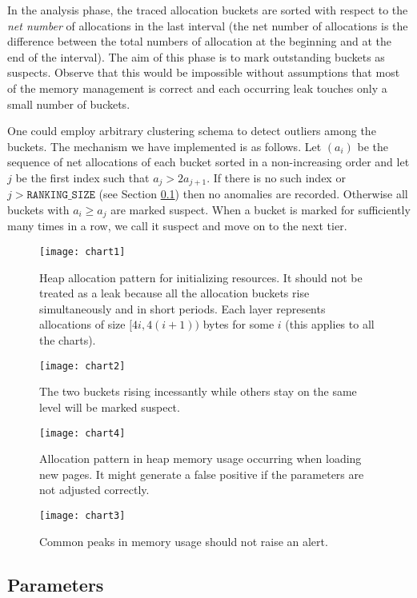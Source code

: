 \documentclass[preprint, numbers]{sigplanconf}
\begin{document}
In the analysis phase, the traced allocation buckets are sorted with respect to the \textit{net number} of allocations
in the last interval
(the net number of allocations is the difference between the total numbers of allocation at
the beginning and at the end of the interval).
The aim of this phase is to mark outstanding buckets as suspects.
Observe that this would be impossible without assumptions that
most of the memory management is correct and each occurring leak
touches only a small number of buckets.

One could employ arbitrary clustering schema to detect outliers among the buckets.
The mechanism we have implemented is as follows.
Let $(a_i)$ be the sequence of net allocations of each bucket sorted in a non-increasing order
and let $j$ be the first index such that $a_j > 2a_{j+1}$.
If there is no such index or $j > \texttt{RANKING\_SIZE}$ (see Section \ref{sec:params}) then no anomalies are recorded.
Otherwise all buckets with $a_i \ge a_j$ are marked suspect.
When a bucket is marked for sufficiently many times in a row,
we call it suspect and move on to the next tier.

\begin{figure}
\centering
\texttt{[image: chart1]}
\caption{Heap allocation pattern for initializing resources.
	It should not be treated as a leak because all the allocation buckets rise
	simultaneously and in short periods.
	Each layer represents allocations of size $[4i, 4(i+1))$ bytes for some $i$
	(this applies to all the charts).}
\label{fig:chart1}
\vspace{0.5cm}

\texttt{[image: chart2]}
\caption{The two buckets rising incessantly while others stay on the same level will
	be marked suspect.}
\label{fig:chart2}
\end{figure}

\begin{figure}
\centering
\texttt{[image: chart4]}
	\caption{Allocation pattern in heap memory usage occurring when loading new pages.
	It might generate a false positive if the parameters are not adjusted correctly.}
\label{fig:chart4}
\vspace{1.08cm}

\texttt{[image: chart3]}
	\caption{Common peaks in memory usage should not raise an alert.}
\label{fig:chart3}
\end{figure}

\subsection{Parameters}
\label{sec:params}
\end{document}
